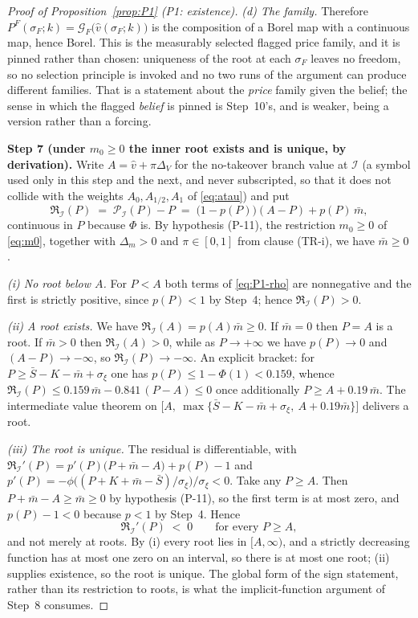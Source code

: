 \documentclass[11pt]{article}
\begin{document}
\begin{proof}[Proof of Proposition~\ref{prop:P1} (P1: existence)]
\emph{(d) The family.} Therefore $P^F(\sigma_F;k) = \mathcal G_F\bigl(\hat v(\sigma_F;k)\bigr)$ is
the composition of a Borel map with a continuous map, hence Borel. This is the measurably selected
flagged price family, and it is pinned rather than chosen: uniqueness of the root at each $\sigma_F$
leaves no freedom, so no selection principle is invoked and no two runs of the argument can produce
different families. That is a statement about the \emph{price} family given the belief; the sense in
which the flagged \emph{belief} is pinned is Step~10's, and is weaker, being a version rather than a
forcing.

\smallskip
\noindent\textbf{Step 7 (under $m_0 \ge 0$ the inner root exists and is unique, by derivation).}
Write $A = \hat v + \pi\Delta_V$ for the no-takeover branch value at $\mathcal I$ (a symbol used
only in this step and the next, and never subscripted, so that it does not collide with the weights
$A_0,A_{1/2},A_1$ of \eqref{eq:atau}) and put
\begin{equation}
\label{eq:P1-rho}
\mathfrak R_{\mathcal I}(P) \;=\; \mathcal P_{\mathcal I}(P) - P \;=\; \bigl(1-p(P)\bigr)(A-P) + p(P)\,\bar m,
\end{equation}
continuous in $P$ because $\Phi$ is. By hypothesis (P-11), the restriction $m_0 \ge 0$ of
\eqref{eq:m0}, together with $\Delta_m > 0$ and $\pi \in [0,1]$ from clause (TR-i), we have
$\bar m \ge 0$.

\emph{(i) No root below $A$.} For $P < A$ both terms of \eqref{eq:P1-rho} are nonnegative and the
first is strictly positive, since $p(P) < 1$ by Step~4; hence $\mathfrak R_{\mathcal I}(P) > 0$.

\emph{(ii) A root exists.} We have $\mathfrak R_{\mathcal I}(A) = p(A)\bar m \ge 0$. If $\bar m = 0$ then $P = A$ is a
root. If $\bar m > 0$ then $\mathfrak R_{\mathcal I}(A) > 0$, while as $P \to +\infty$ we have $p(P) \to 0$ and
$(A-P) \to -\infty$, so $\mathfrak R_{\mathcal I}(P) \to -\infty$. An explicit bracket: for
$P \ge \bar S-K-\bar m+\sigma_\xi$ one has $p(P) \le 1-\Phi(1) < 0.159$, whence
$\mathfrak R_{\mathcal I}(P) \le 0.159\,\bar m - 0.841\,(P-A) \le 0$ once additionally $P \ge A+0.19\,\bar m$. The
intermediate value theorem on $\bigl[A,\ \max\{\bar S-K-\bar m+\sigma_\xi,\ A+0.19\bar m\}\bigr]$
delivers a root.

\emph{(iii) The root is unique.} The residual is differentiable, with
$\mathfrak R_{\mathcal I}'(P) = p'(P)\bigl(P+\bar m-A\bigr) + p(P) - 1$ and
$p'(P) = -\phi\bigl((P+K+\bar m-\bar S)/\sigma_\xi\bigr)/\sigma_\xi < 0$. Take any $P \ge A$. Then
$P+\bar m-A \ge \bar m \ge 0$ by hypothesis (P-11), so the first term is at most zero, and
$p(P)-1 < 0$ because $p < 1$ by Step~4. Hence
\[
\mathfrak R_{\mathcal I}'(P) \;<\; 0 \qquad \text{for every } P \ge A,
\]
and not merely at roots. By (i) every root lies in $[A,\infty)$, and a strictly decreasing function
has at most one zero on an interval, so there is at most one root; (ii) supplies existence, so the
root is unique. The global form of the sign statement, rather than its restriction to roots, is what
the implicit-function argument of Step~8 consumes.


\end{proof}
\end{document}
